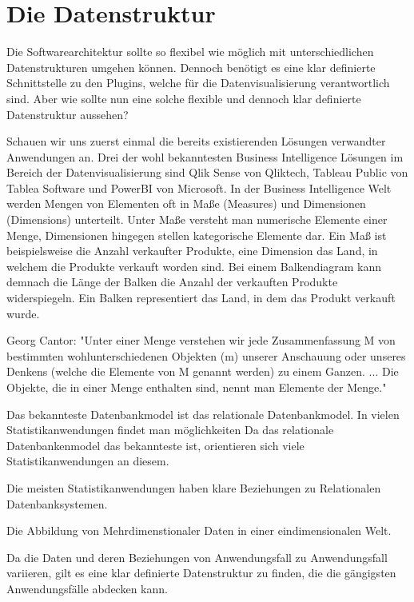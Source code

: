 
\section{Die Datenstruktur}
Die Softwarearchitektur sollte so flexibel wie möglich mit unterschiedlichen Datenstrukturen
umgehen können. Dennoch benötigt es eine klar definierte Schnittstelle zu den Plugins,
welche für die Datenvisualisierung verantwortlich sind. Aber wie sollte nun eine solche flexible 
und dennoch klar definierte Datenstruktur aussehen?

Schauen wir uns zuerst einmal die bereits existierenden Lösungen verwandter Anwendungen an. Drei der
wohl bekanntesten Business Intelligence Lösungen im Bereich der Datenvisualisierung sind Qlik Sense
von Qliktech, Tableau Public von Tablea Software und PowerBI von Microsoft. In der Business Intelligence
Welt werden Mengen von Elementen oft in Maße (Measures) und Dimensionen (Dimensions) unterteilt. Unter Maße versteht
man numerische Elemente einer Menge, Dimensionen hingegen stellen kategorische Elemente dar. Ein Maß
ist beispielsweise die Anzahl verkaufter Produkte, eine Dimension das Land, in welchem die Produkte verkauft worden
sind. Bei einem Balkendiagram kann demnach die Länge der Balken die Anzahl der verkauften Produkte
widerspiegeln. Ein Balken representiert das Land, in dem das Produkt verkauft wurde.


Georg Cantor: "Unter einer Menge verstehen wir jede Zusammenfassung M von bestimmten wohlunterschiedenen
Objekten (m) unserer Anschauung oder unseres Denkens (welche die Elemente von M genannt werden) zu einem Ganzen.
... Die Objekte, die in einer Menge enthalten sind, nennt man Elemente der Menge."

Das bekannteste Datenbankmodel ist das relationale Datenbankmodel. In vielen Statistikanwendungen findet
man möglichkeiten
Da das relationale Datenbankenmodel das bekannteste ist, orientieren sich viele Statistikanwendungen an diesem.

Die meisten Statistikanwendungen haben klare Beziehungen zu Relationalen Datenbanksystemen. 

Die Abbildung von Mehrdimenstionaler Daten in einer eindimensionalen Welt.




Da die Daten und deren Beziehungen von Anwendungsfall zu Anwendungsfall
variieren, gilt es eine klar definierte Datenstruktur zu finden, die
die gängigsten Anwendungsfälle abdecken kann. 

